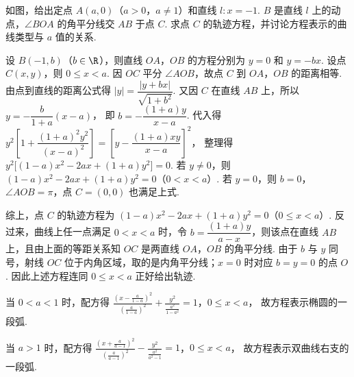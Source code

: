 \documentclass[UTF8,a4paper,oneside,11pt]{ctexbook}
\begin{document}
\begin{problem}
如图，给出定点 \(A(a,0)\)（\(a>0\)，\(a\neq 1\)）和直线 \(l:x=-1\). \(B\) 是直线 \(l\) 上的动点，\(\angle BOA\) 的角平分线交 \(AB\) 于点 \(C\). 求点 \(C\) 的轨迹方程，并讨论方程表示的曲线类型与 \(a\) 值的关系.

\end{problem}

\begin{solution}
设 \(B(-1,b)\)（\(b\in\R\)），则直线 \(OA\)，\(OB\) 的方程分别为 \(y=0\) 和 \(y=-bx\).
设点 \(C(x,y)\)，则 \(0\le x<a\). 因 \(OC\) 平分 \(\angle AOB\)，故点 \(C\) 到 \(OA\)，\(OB\) 的距离相等. 由点到直线的距离公式得 \( |y|=\dfrac{|y+bx|}{\sqrt{1+b^2}} \).
又因 \(C\) 在直线 \(AB\) 上，所以 \(y=-\dfrac{b}{1+a}(x-a)\)，
即 \(b=-\dfrac{(1+a)y}{x-a}\).
代入得
\(y^2\left[1+\dfrac{(1+a)^2y^2}{(x-a)^2}\right]
=\left[y-\dfrac{(1+a)xy}{x-a}\right]^2\)，
整理得 \(y^2\bigl[(1-a)x^2-2ax+(1+a)y^2\bigr]=0\).
若 \(y\neq 0\)，则 \((1-a)x^2-2ax+(1+a)y^2=0\)（\(0<x<a\)）.
若 \(y=0\)，则 \(b=0\)，\(\angle AOB=\pi\)，点 \(C=(0,0)\) 也满足上式.

综上，点 \(C\) 的轨迹方程为
\((1-a)x^2-2ax+(1+a)y^2=0\)（\(0\le x<a\)）. 反过来，曲线上任一点满足 \(0<x<a\) 时，令
\(b=\dfrac{(1+a)y}{a-x}\)，则该点在直线 \(AB\) 上，且由上面的等距关系知 \(OC\) 是两直线 \(OA\)，\(OB\) 的角平分线. 由于 \(b\) 与 \(y\) 同号，射线 \(OC\) 位于内角区域，取的是内角平分线；\(x=0\) 时对应 \(b=y=0\) 的点 \(O\). 因此上述方程连同 \(0\le x<a\) 正好给出轨迹.

当 \(0<a<1\) 时，配方得
\(\frac{\left(x-\frac{a}{1-a}\right)^2}{\left(\frac{a}{1-a}\right)^2} +\frac{y^2}{\frac{a^2}{1-a^2}}=1\)，\(0\le x<a\)，
故方程表示椭圆的一段弧.

当 \(a>1\) 时，配方得
\(\frac{\left(x+\frac{a}{a-1}\right)^2}{\left(\frac{a}{a-1}\right)^2} -\frac{y^2}{\frac{a^2}{a^2-1}}=1\)，\(0\le x<a\)，
故方程表示双曲线右支的一段弧.
\end{solution}

\end{document}
